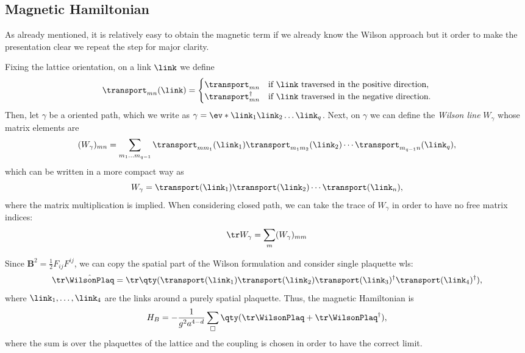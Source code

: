 \subsection{Magnetic Hamiltonian}
\label{sub:magnetic_hamiltonian}

As already mentioned, it is relatively easy to obtain the magnetic term if we already know the Wilson approach but it order to make the presentation clear we repeat the step for major clarity.

Fixing the lattice orientation, on a link $\link$ we define
\begin{equation}
    \transport_{mn}(\link) =
    \begin{cases}
        \transport_{mn} & \text{if $\link$ traversed in the positive direction}, \\
        \transport_{mn}^{\dagger} & \text{if $\link$ traversed in the negative direction}.
    \end{cases}
\end{equation}
Then, let $\gamma$ be a oriented path, which we write as $\gamma = \ev*{\link_1 \link_2 \dots \link_q}$.
Next, on $\gamma$ we can define the \emph{Wilson line} $W_{\gamma}$ whose matrix elements are
\begin{equation}
    (W_{\gamma})_{mn} =
    \sum_{m_1 \dots m_{q-1}}
        \transport_{m m_1} (\link_1)
        \transport_{m_1 m_2} (\link_2)
        \cdots
        \transport_{m_{q-1} n} (\link_q),
\end{equation}
which can be written in a more compact way as
\begin{equation}
    W_{\gamma} =
        \transport(\link_1)
        \transport(\link_2)
        \cdots
        \transport(\link_n),
\end{equation}
where the matrix multiplication is implied.
When considering closed path, we can take the trace of $W_{\gamma}$ in order to have no free matrix indices:
\begin{equation}
    \tr W_{\gamma} = \sum_{m} (W_{\gamma})_{mm}
\end{equation}

Since $\mathbf{B}^2 = \frac{1}{2} F_{ij} F^{ij}$, we can copy the spatial part of the Wilson formulation and consider single plaquette \ac{wl}s:
\begin{equation}
    \tr \hat{\WilsonPlaq} = \tr \qty(
        \transport(\link_1) \transport(\link_2) \transport(\link_3)^{\dagger}  \transport(\link_4)^{\dagger}
    ),
\end{equation}
where $\link_1, \dots, \link_4$ are the links around a purely spatial plaquette.
Thus, the magnetic Hamiltonian is
\begin{equation}
    H_B = - \frac{1}{g^2 a^{4-d}} \sum_{\square} \qty( \tr \WilsonPlaq + \tr \WilsonPlaq^{\dagger} ),
\end{equation}
where the sum is over the plaquettes of the lattice and the coupling is chosen in order to have the correct limit.


